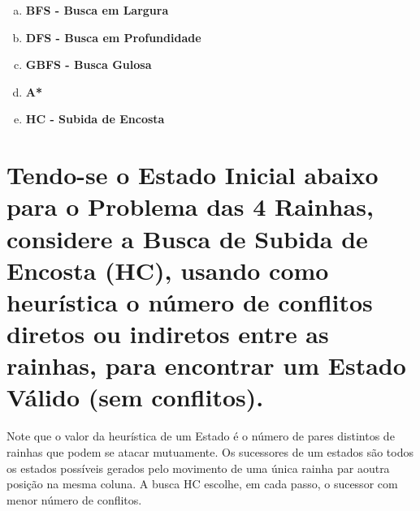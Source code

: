 \documentclass[paper=a4, fontsize=11pt]{scrartcl} %
\begin{document}
    \begin{enumerate}[(a)]
        \item \textbf{BFS - Busca em Largura}
        \par 
        \vspace{0.2cm}
        \pagebreak
        \item \textbf{DFS - Busca em Profundidade}
        \par 
        \vspace{0.2cm}

        
        \item \textbf{GBFS - Busca Gulosa}
        \par 
        \vspace{0.2cm}
        \pagebreak
        \item \textbf{A*}
        \par 
        \vspace{0.2cm}

        \item \textbf{HC - Subida de Encosta}
        \par 
        \vspace{0.2cm}

    \end{enumerate}

    
    \section{Tendo-se o Estado Inicial abaixo para o Problema das 4 Rainhas, considere a Busca de Subida de Encosta (HC), usando como heurística o número de conflitos diretos ou indiretos entre as rainhas, para encontrar um Estado Válido (sem conflitos).}
    
    \vspace{0.8cm}
    \par{Note que o valor da heurística de um Estado é o número de pares distintos de rainhas que podem se atacar mutuamente. Os sucessores de um estados são todos os estados possíveis gerados pelo movimento de uma única rainha par aoutra posição na mesma coluna. A busca HC escolhe, em cada passo, o sucessor com menor número de conflitos.}
\end{document}
